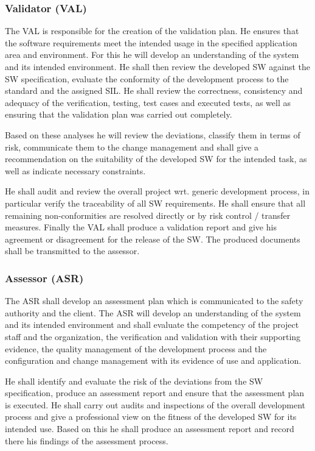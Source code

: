 \subsubsection{Validator (VAL)}
\label{sec:validator}

The VAL is responsible for the creation of the validation plan. He ensures that
the software requirements meet the intended usage in the specified application
area and environment. For this he will develop an understanding of the system
and its intended environment. He shall then review the developed SW against the
SW specification, evaluate the conformity of the development process to the
standard and the assigned SIL. He shall review the correctness, consistency and
adequacy of the verification, testing, test cases and executed tests, as well as
ensuring that the validation plan was carried out completely.

Based on these analyses he will review the deviations, classify them in terms
of risk, communicate them to the change management and shall give a
recommendation on the suitability of the developed SW for the intended task, as
well as indicate necessary constraints.

He shall audit and review the overall project wrt. generic development process,
in particular verify the traceability of all SW requirements. He shall ensure
that all remaining non-conformities are resolved directly or by risk control /
transfer measures. Finally the VAL shall produce a validation report and give
his agreement or disagreement for the release of the SW. The produced documents
shall be transmitted to the assessor.

\subsubsection{Assessor (ASR)}
\label{sec:assessor}

The ASR shall develop an assessment plan which is communicated to the safety
authority and the client. The ASR will develop an understanding of the system
and its intended environment and shall evaluate the competency of the project
staff and the organization, the verification and validation with their
supporting evidence, the quality management of the development process and the
configuration and change management with its evidence of use and application.

He shall identify and evaluate the risk of the deviations from the SW
specification, produce an assessment report and ensure that the assessment plan
is executed. He shall carry out audits and inspections of the overall
development process and give a professional view on the fitness of the developed
SW for its intended use. Based on this he shall produce an assessment report and
record there his findings of the assessment process.

